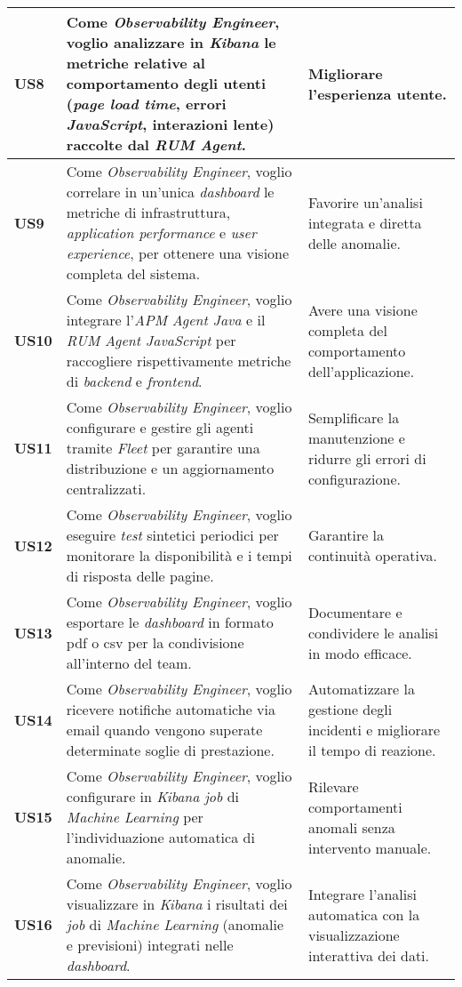 \begin{longtable}{|p{1cm}|p{8cm}|p{3cm}|}
\textbf{US8} & Come \emph{Observability Engineer}, voglio analizzare in \emph{Kibana} le metriche relative al comportamento degli utenti (\emph{page load time}, errori \emph{JavaScript}, interazioni lente) raccolte dal \emph{RUM Agent}. & Migliorare l'esperienza utente. \\
\hline

\textbf{US9} & Come \emph{Observability Engineer}, voglio correlare in un'unica \emph{dashboard} le metriche di infrastruttura, \emph{application performance} e \emph{user experience}, per ottenere una visione completa del sistema. & Favorire un'analisi integrata e diretta delle anomalie. \\
\hline

\textbf{US10} & Come \emph{Observability Engineer}, voglio integrare l'\emph{APM Agent Java} e il \emph{RUM Agent JavaScript} per raccogliere rispettivamente metriche di \emph{backend} e \emph{frontend}. & Avere una visione completa del comportamento dell'applicazione. \\
\hline

\textbf{US11} & Come \emph{Observability Engineer}, voglio configurare e gestire gli agenti tramite \emph{Fleet} per garantire una distribuzione e un aggiornamento centralizzati. & Semplificare la manutenzione e ridurre gli errori di configurazione. \\
\hline

\textbf{US12} & Come \emph{Observability Engineer}, voglio eseguire \emph{test} sintetici periodici per monitorare la disponibilità e i tempi di risposta delle pagine. & Garantire la continuità operativa. \\
\hline

\textbf{US13} & Come \emph{Observability Engineer}, voglio esportare le \emph{dashboard} in formato \gls{pdf} o \gls{csv} per la condivisione all'interno del team. & Documentare e condividere le analisi in modo efficace. \\
\hline

\textbf{US14} & Come \emph{Observability Engineer}, voglio ricevere notifiche automatiche via email quando vengono superate determinate soglie di prestazione. & Automatizzare la gestione degli incidenti e migliorare il tempo di reazione. \\
\hline

\textbf{US15} & Come \emph{Observability Engineer}, voglio configurare in \emph{Kibana} \emph{job} di \emph{Machine Learning} per l'individuazione automatica di anomalie. & Rilevare comportamenti anomali senza intervento manuale. \\
\hline

\textbf{US16} & Come \emph{Observability Engineer}, voglio visualizzare in \emph{Kibana} i risultati dei \emph{job} di \emph{Machine Learning} (anomalie e previsioni) integrati nelle \emph{dashboard}. & Integrare l'analisi automatica con la visualizzazione interattiva dei dati. \\
\hline

\end{longtable}


